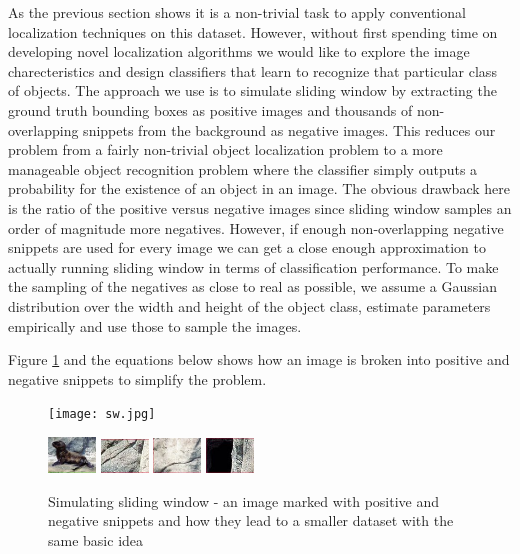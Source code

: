 \documentclass[10pt,twocolumn,letterpaper]{article}
\begin{document}
As the previous section shows it is a non-trivial task to apply conventional localization
techniques on this dataset. However, without first spending time on developing novel 
localization algorithms we would like to explore the image charecteristics and design
classifiers that learn to recognize that particular class of objects. The approach we use
is to simulate sliding window by extracting the ground truth bounding boxes as positive
images and thousands of non-overlapping snippets from the background as negative images. 
This reduces our problem from a fairly non-trivial object localization problem to a more manageable
object recognition problem where the classifier simply outputs a probability for the existence
of an object in an image. The obvious drawback here is the ratio of the positive versus negative
images since sliding window samples an order of magnitude more negatives. However, if enough
non-overlapping negative snippets are used for every image we can get a close enough approximation
to actually running sliding window in terms of classification performance. To make the sampling of
the negatives as close to real as possible, we assume a Gaussian distribution over the width and height
of the object class, estimate parameters empirically and use those to sample the images.

Figure \ref{fig:sliding} and the equations below shows how an image is broken into positive and negative snippets to simplify the
problem.

\begin{figure}[t]
\begin{center}
   \texttt{[image: sw.jpg]}    
\end{center}
\begin{center}
   \includegraphics[width=0.5in]{sw_p1.jpg}    
   \includegraphics[width=0.5in]{sw_n1.jpg}    
   \includegraphics[width=0.5in]{sw_n2.jpg}    
   \includegraphics[width=0.5in]{sw_n3.jpg}    
\end{center}
   \caption{Simulating sliding window - an image marked with positive and negative snippets and how they lead to a smaller dataset 
            with the same basic idea}
\label{fig:sliding}
\end{figure}
\end{document}
